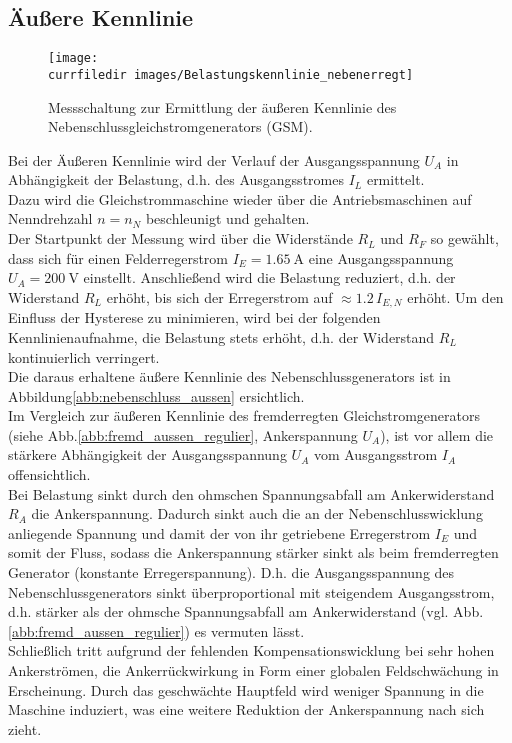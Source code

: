 \subsection{Äußere Kennlinie}
\begin{figure} [htb]
    \centering
    \texttt{[image: \\currfiledir images/Belastungskennlinie\_nebenerregt]}
    \caption{Messschaltung zur Ermittlung der äußeren Kennlinie des Nebenschluss\-gleich\-strom\-generators (GSM).}
    \label{abb:neben_BKL_Messschaltung}
\end{figure}
\noindent Bei der Äußeren Kennlinie wird der Verlauf der Ausgangsspannung $U_A$ in Abhängigkeit der Belastung, d.h. des Ausgangsstromes $I_L$ ermittelt.\\
Dazu wird die Gleichstrommaschine wieder über die Antriebsmaschinen auf Nenndrehzahl $n=n_N$ beschleunigt und gehalten.\\
Der Startpunkt der Messung wird über die Widerstände $R_L$ und $R_F$ so gewählt, dass sich für einen Felderregerstrom $I_E=\SI{1.65}{\ampere}$ eine Ausgangsspannung $U_A=\SI{200}{\volt}$ einstellt. Anschließend wird die Belastung reduziert, d.h. der Widerstand $R_L$ erhöht, bis sich der Erregerstrom auf $\approx1.2\,I_{E,N}$ erhöht. Um den Einfluss der Hysterese zu minimieren, wird bei der folgenden Kennlinienaufnahme, die Belastung stets erhöht, d.h. der Widerstand $R_L$ kontinuierlich verringert.\\
Die daraus erhaltene äußere Kennlinie des Nebenschlussgenerators ist in Abbildung\;\ref{abb:nebenschluss_aussen} ersichtlich.\\
Im Vergleich zur äußeren Kennlinie des fremderregten Gleichstromgenerators (siehe Abb.\;\ref{abb:fremd_aussen_regulier}, Ankerspannung $U_A$), ist vor allem die stärkere Abhängigkeit der Ausgangsspannung $U_A$ vom Ausgangsstrom $I_A$ offensichtlich.\\
Bei Belastung sinkt durch den ohmschen Spannungsabfall am Ankerwiderstand $R_A$ die Ankerspannung. Dadurch sinkt auch die an der Nebenschlusswicklung anliegende Spannung und damit der von ihr getriebene Erregerstrom $I_E$ und somit der Fluss, sodass die Ankerspannung stärker sinkt als beim fremderregten Generator (konstante Erregerspannung). D.h. die Ausgangsspannung des Nebenschlussgenerators sinkt überproportional mit steigendem Ausgangsstrom, d.h. stärker als der ohmsche Spannungsabfall am Ankerwiderstand (vgl. Abb.\;\ref{abb:fremd_aussen_regulier}) es vermuten lässt.\\
Schließlich tritt aufgrund der fehlenden Kompensationswicklung bei sehr hohen Ankerströmen, die Ankerrückwirkung in Form einer globalen Feldschwächung in Erscheinung. Durch das geschwächte Hauptfeld wird weniger Spannung in die Maschine induziert, was eine weitere Reduktion der Ankerspannung nach sich zieht.\\
